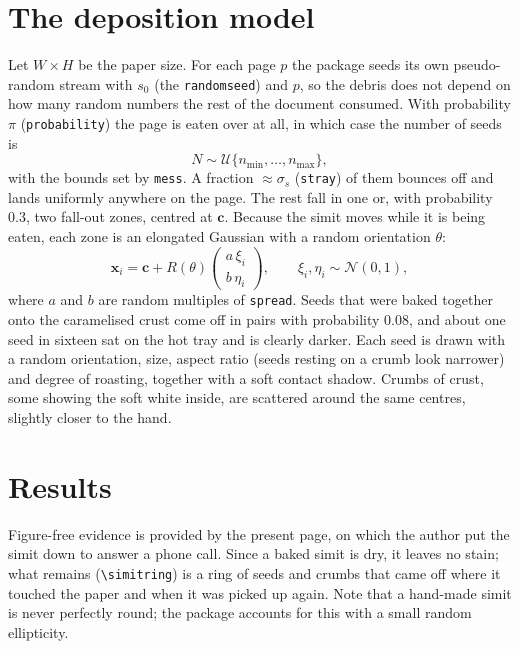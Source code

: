 \documentclass[11pt,a4paper]{article}
\begin{document}
\section{The deposition model}

Let $W\times H$ be the paper size. For each page $p$ the package seeds its
own pseudo-random stream with $s_0$ (the \texttt{randomseed}) and $p$, so the
debris does not depend on how many random numbers the rest of the document
consumed. With probability $\pi$ (\texttt{probability}) the page is eaten
over at all, in which case the number of seeds is
\begin{equation}
  N \sim \mathcal{U}\{n_{\min},\dots,n_{\max}\},
\end{equation}
with the bounds set by \texttt{mess}. A fraction $\approx\sigma_s$
(\texttt{stray}) of them bounces off and lands uniformly anywhere on the page.
The rest fall in one or, with probability $0.3$, two fall-out zones, centred
at $\mathbf{c}$. Because the simit moves while it is being eaten, each zone is
an elongated Gaussian with a random orientation $\theta$:
\begin{equation}
  \mathbf{x}_i = \mathbf{c} + R(\theta)
  \begin{pmatrix} a\,\xi_i \\ b\,\eta_i \end{pmatrix},
  \qquad \xi_i,\eta_i \sim \mathcal{N}(0,1),
\end{equation}
where $a$ and $b$ are random multiples of \texttt{spread}. Seeds that were
baked together onto the caramelised crust come off in pairs with probability
$0.08$, and about one seed in sixteen sat on the hot tray and is clearly
darker. Each seed is drawn with a random orientation, size, aspect ratio
(seeds resting on a crumb look narrower) and degree of roasting, together
with a soft contact shadow. Crumbs of crust, some showing the soft white
inside, are scattered around the same centres, slightly closer to the hand.

\clearpage
\section{Results}

\simitring{10.5cm}{9.5cm}%
Figure-free evidence is provided by the present page, on which the author
put the simit down to answer a phone call. Since a baked simit is dry, it
leaves no stain; what remains (\verb|\simitring|) is a ring of seeds and
crumbs that came off where it touched the paper and when it was picked up
again. Note that a hand-made simit is never perfectly round; the package
accounts for this with a small random ellipticity.
\end{document}

